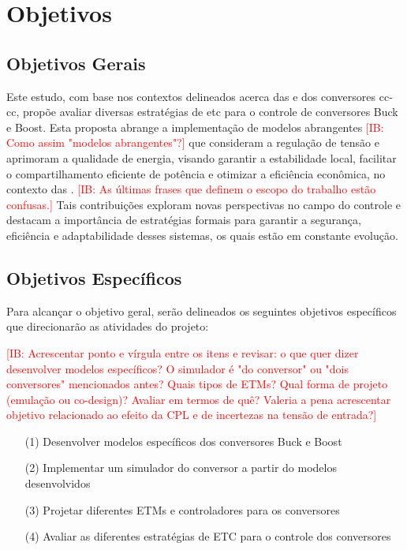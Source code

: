 \section{Objetivos}

\subsection{Objetivos Gerais}

Este estudo, com base nos contextos delineados acerca das  e dos conversores \acrshort{cc}-\acrshort{cc}, propõe avaliar diversas estratégias de \acrshort{etc} para o controle de conversores Buck e Boost. Esta proposta abrange a implementação de modelos abrangentes \textcolor{red}{[IB: Como assim "modelos abrangentes"?]} que consideram a regulação de tensão e aprimoram a qualidade de energia, visando garantir a estabilidade local, facilitar o compartilhamento eficiente de potência e otimizar a eficiência econômica, no contexto das . \textcolor{red}{[IB: As últimas frases que definem o escopo do trabalho estão confusas.]} Tais contribuições exploram novas perspectivas no campo do controle e destacam a importância de estratégias formais para garantir a segurança, eficiência e adaptabilidade desses sistemas, os quais estão em constante evolução.

\subsection{Objetivos Específicos}
Para alcançar o objetivo geral, serão delineados os seguintes objetivos específicos que direcionarão as atividades do projeto:

\textcolor{red}{[IB: Acrescentar ponto e vírgula entre os itens e revisar: o que quer dizer desenvolver modelos específicos? O simulador é "do conversor" ou "dois conversores" mencionados antes? Quais tipos de ETMs? Qual forma de projeto (emulação ou co-design)? Avaliar em termos de quê? Valeria a pena acrescentar objetivo relacionado ao efeito da CPL e de incertezas na tensão de entrada?]}

\begin{enumerate}
  \item[(1)] Desenvolver modelos específicos dos conversores Buck e Boost
  \item[(2)] Implementar um simulador do conversor a partir do modelos desenvolvidos
  \item[(3)] Projetar diferentes ETMs e controladores para os conversores
  \item[(4)] Avaliar as diferentes estratégias de ETC para o controle dos conversores
\end{enumerate}

